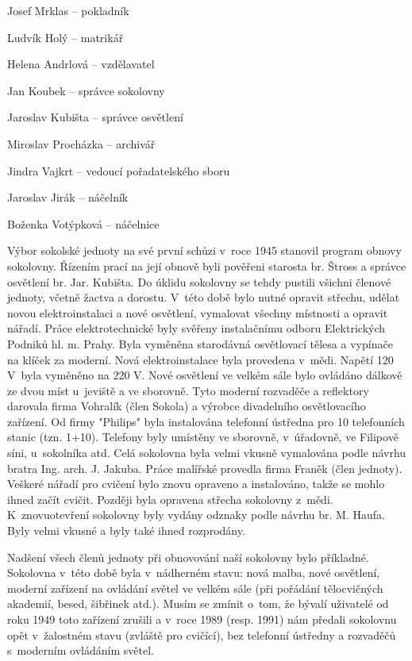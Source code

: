 \documentclass[a5paper, 11pt, twoside]{article}
\begin{document}
Josef Mrklas -- pokladník

Ludvík Holý -- matrikář

Helena Andrlová -- vzdělavatel

Jan Koubek -- správce sokolovny

Jaroslav Kubišta -- správce osvětlení

Miroslav Procházka -- archivář

Jindra Vajkrt -- vedoucí pořadatelského sboru

Jaroslav Jirák -- náčelník

Boženka Votýpková -- náčelnice
\medskip

Výbor sokolské jednoty na své první schůzi v~roce 1945 stanovil program
obnovy sokolovny. Řízením prací na její obnově byli pověřeni starosta
br. Štross a správce osvětlení br. Jar. Kubišta. Do úklidu sokolovny se
tehdy pustili všichni členové jednoty, včetně žactva a dorostu. V~této
době bylo nutné opravit střechu, udělat novou elektroinstalaci a nové
osvětlení, vymalovat všechny místnosti a opravit nářadí. Práce
elektrotechnické byly svěřeny instalačnímu odboru Elektrických Podniků
hl. m. Prahy. Byla vyměněna starodávná osvětlovací tělesa a vypínače na
klíček za moderní. Nová elektroinstalace byla provedena v~mědi. Napětí
120 V~byla vyměněno na 220 V. Nové osvětlení ve velkém sále bylo
ovládáno dálkově ze dvou míst u~jeviště a ve sborovně. Tyto moderní
rozvaděče a reflektory darovala firma Vohralík (člen Sokola) a výrobce
divadelního osvětlovacího zařízení. Od firmy "Philips" byla instalována
telefonní ústředna pro 10 telefonních stanic (tzn. 1+10). Telefony byly
umístěny ve sborovně, v~úřadovně, ve Filipově síni, u~sokolníka atd.
Celá sokolovna byla velmi vkusně vymalována podle návrhu bratra Ing.
arch. J. Jakuba. Práce malířské provedla firma Franěk (člen jednoty).
Veškeré nářadí pro cvičení bylo znovu opraveno a instalováno, takže se
mohlo ihned začít cvičit. Později byla opravena střecha sokolovny
z~mědi. K~znovuotevření sokolovny byly vydány odznaky podle návrhu br. M.
Haufa. Byly velmi vkusné a byly také ihned rozprodány.

Nadšení všech členů jednoty při obnovování naší sokolovny bylo
příkladné. Sokolovna v~této době byla v~nádherném stavu: nová malba,
nové osvětlení, moderní zařízení na ovládání světel ve velkém sále (při
pořádání tělocvičných akademií, besed, šibřinek atd.). Musím se zmínit
o~tom, že bývalí uživatelé od roku 1949 toto zařízení zrušili a v~roce
1989 (resp. 1991) nám předali sokolovnu opět v~žalostném stavu (zvláště
pro cvičící), bez telefonní ústředny a rozvaděčů s~moderním ovládáním
světel.
\end{document}
